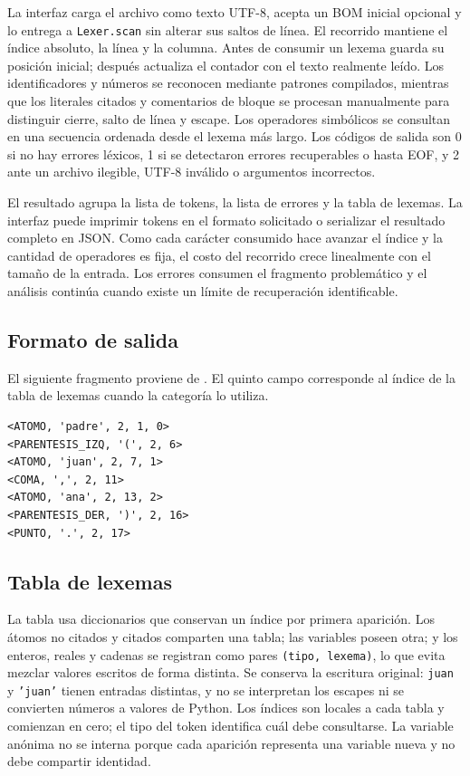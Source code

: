 La interfaz carga el archivo como texto UTF-8, acepta un BOM inicial opcional y lo entrega a \texttt{Lexer.scan} sin alterar sus saltos de línea. El recorrido mantiene el índice absoluto, la línea y la columna. Antes de consumir un lexema guarda su posición inicial; después actualiza el contador con el texto realmente leído. Los identificadores y números se reconocen mediante patrones compilados, mientras que los literales citados y comentarios de bloque se procesan manualmente para distinguir cierre, salto de línea y escape. Los operadores simbólicos se consultan en una secuencia ordenada desde el lexema más largo. Los códigos de salida son 0 si no hay errores léxicos, 1 si se detectaron errores recuperables o hasta EOF, y 2 ante un archivo ilegible, UTF-8 inválido o argumentos incorrectos.

El resultado agrupa la lista de tokens, la lista de errores y la tabla de lexemas. La interfaz puede imprimir tokens en el formato solicitado o serializar el resultado completo en JSON. Como cada carácter consumido hace avanzar el índice y la cantidad de operadores es fija, el costo del recorrido crece linealmente con el tamaño de la entrada. Los errores consumen el fragmento problemático y el análisis continúa cuando existe un límite de recuperación identificable.

\subsection{Formato de salida}

El siguiente fragmento proviene de . El quinto campo corresponde al índice de la tabla de lexemas cuando la categoría lo utiliza.

\begin{lstlisting}[style=terminal]
<ATOMO, 'padre', 2, 1, 0>
<PARENTESIS_IZQ, '(', 2, 6>
<ATOMO, 'juan', 2, 7, 1>
<COMA, ',', 2, 11>
<ATOMO, 'ana', 2, 13, 2>
<PARENTESIS_DER, ')', 2, 16>
<PUNTO, '.', 2, 17>
\end{lstlisting}

\subsection{Tabla de lexemas}

La tabla usa diccionarios que conservan un índice por primera aparición. Los átomos no citados y citados comparten una tabla; las variables poseen otra; y los enteros, reales y cadenas se registran como pares \texttt{(tipo, lexema)}, lo que evita mezclar valores escritos de forma distinta. Se conserva la escritura original: \texttt{juan} y \texttt{'juan'} tienen entradas distintas, y no se interpretan los escapes ni se convierten números a valores de Python. Los índices son locales a cada tabla y comienzan en cero; el tipo del token identifica cuál debe consultarse. La variable anónima no se interna porque cada aparición representa una variable nueva y no debe compartir identidad.

